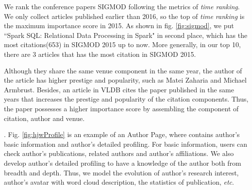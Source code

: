 We rank the conference papers \eg SIGMOD following the metrics of {\em time ranking}. We only collect articles published earlier than 2016, so the top of {\em time ranking} is the maximum importance score in 2015. As shown in fig. \ref{fig:sigmod}, we put ``Spark SQL: Relational Data Processing in Spark" in second place, which has the most citations(653) in SIGMOD 2015 up to now. More generally, in our top 10, there are 3 articles that has the most citation in SIGMOD 2015.

\par
Although they share the same venue component in the same year, the author of the article has higher prestige and popularity, such as Matei Zaharia and Michael Armbrust. Besides, an article in VLDB cites the paper published in the same years that increases the prestige and popularity of the citation components. Thus, the paper possesses a higher importance score by assembling the component of citation, author and venue.

. Fig. \ref{fig:hjwProfile} is an example of an Author Page, where contains author's basic information and author's detailed profiling. For basic information, users can check author's publications, related authors and author's affiliations. We also develop author's detailed profiling to have a knowledge of the author both from breadth and depth. Thus, we model the evolution of author's research interest, author's avatar with word cloud description, the statistics of publication, {\em etc}.


